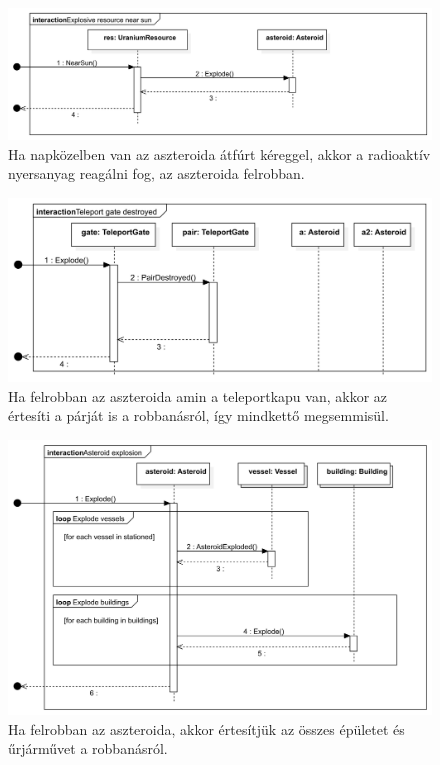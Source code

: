 \begin{figure}[H] 
\centering 
\includegraphics[width=1\textwidth]{docs/3_Project/svg/Design Model!Sun Distance!Resource Explosion!Explosive resource near sun_7.png} 
\caption{Ha napközelben van az aszteroida átfúrt kéreggel, akkor a radioaktív nyersanyag reagálni fog, az aszteroida felrobban.} 
\end{figure} 

\begin{figure}[H] 
\centering 
\includegraphics[width=1\textwidth]{docs/3_Project/svg/Design Model!Sun Distance!Teleport gate destroyed!Teleport gate destroyed_8.png} 
\caption{Ha felrobban az aszteroida amin a teleportkapu van, akkor az értesíti a párját is a robbanásról, így mindkettő megsemmisül.} 
\end{figure} 

\begin{figure}[H] 
\centering 
\includegraphics[width=1\textwidth]{docs/3_Project/svg/Design Model!Sun Distance!Asteroid explosion!Asteroid explosion_9.png} 
\caption{Ha felrobban az aszteroida, akkor értesítjük az összes épületet és űrjárművet a robbanásról.} 
\end{figure} 

